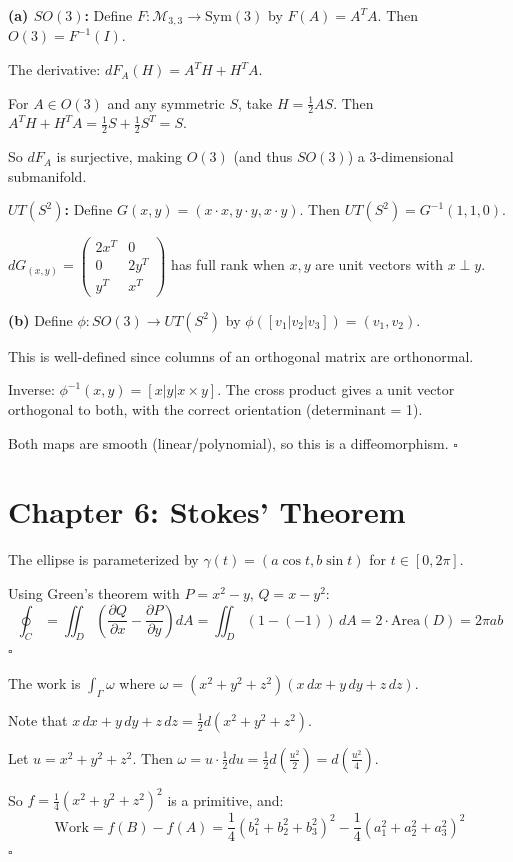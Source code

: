 \documentclass[11pt, letterpaper, openany]{book}
\newenvironment{solution}[1][Solution]{%
  \tcolorbox[blanker, breakable, left=1em,
    before skip=1em, after skip=1em,
    borderline west={2pt}{0pt}{MagicBlue},
    colback=MagicCream,
    before upper={\textcolor{MagicBlue}{\sffamily\bfseries #1.}\space}
  ]%
}{%
  \hfill\textcolor{MagicBlue}{\ensuremath{\square}}\endtcolorbox%
}
\begin{document}
\begin{solution}[5.1]
\textbf{(a) $SO(3)$:} Define $F: \mathcal{M}_{3,3} \to \text{Sym}(3)$ by $F(A) = A^T A$. Then $O(3) = F^{-1}(I)$.

The derivative: $dF_A(H) = A^T H + H^T A$.

For $A \in O(3)$ and any symmetric $S$, take $H = \frac{1}{2}AS$. Then $A^T H + H^T A = \frac{1}{2}S + \frac{1}{2}S^T = S$.

So $dF_A$ is surjective, making $O(3)$ (and thus $SO(3)$) a 3-dimensional submanifold.

\textbf{$UT(S^2)$:} Define $G(x,y) = (x \cdot x, y \cdot y, x \cdot y)$. Then $UT(S^2) = G^{-1}(1,1,0)$.

$dG_{(x,y)} = \begin{pmatrix} 2x^T & 0 \\ 0 & 2y^T \\ y^T & x^T \end{pmatrix}$ has full rank when $x, y$ are unit vectors with $x \perp y$.

\textbf{(b)} Define $\phi: SO(3) \to UT(S^2)$ by $\phi([v_1 | v_2 | v_3]) = (v_1, v_2)$.

This is well-defined since columns of an orthogonal matrix are orthonormal.

Inverse: $\phi^{-1}(x, y) = [x | y | x \times y]$. The cross product gives a unit vector orthogonal to both, with the correct orientation (determinant = 1).

Both maps are smooth (linear/polynomial), so this is a diffeomorphism.
\end{solution}

\section*{Chapter 6: Stokes' Theorem}

\begin{solution}[6.1]
The ellipse is parameterized by $\gamma(t) = (a\cos t, b\sin t)$ for $t \in [0, 2\pi]$.

Using Green's theorem with $P = x^2 - y$, $Q = x - y^2$:
\[
\oint_C = \iint_D \left(\frac{\partial Q}{\partial x} - \frac{\partial P}{\partial y}\right) dA = \iint_D (1 - (-1))\,dA = 2 \cdot \text{Area}(D) = 2\pi ab
\]
\end{solution}

\begin{solution}[6.3]
The work is $\int_\Gamma \omega$ where $\omega = (x^2 + y^2 + z^2)(x\,dx + y\,dy + z\,dz)$.

Note that $x\,dx + y\,dy + z\,dz = \frac{1}{2}d(x^2 + y^2 + z^2)$.

Let $u = x^2 + y^2 + z^2$. Then $\omega = u \cdot \frac{1}{2}du = \frac{1}{2}d(\frac{u^2}{2}) = d(\frac{u^2}{4})$.

So $f = \frac{1}{4}(x^2 + y^2 + z^2)^2$ is a primitive, and:
\[
\text{Work} = f(B) - f(A) = \frac{1}{4}(b_1^2 + b_2^2 + b_3^2)^2 - \frac{1}{4}(a_1^2 + a_2^2 + a_3^2)^2
\]
\end{solution}
\end{document}
